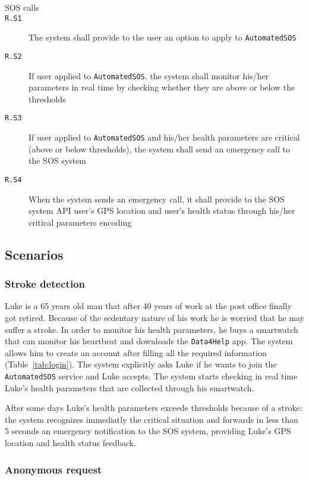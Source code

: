 \begin{description}
      \item[SOS calls]
      \item[\texttt{R.S1}] The system shall provide to the user an option to apply to \texttt{AutomatedSOS}
      \item[\texttt{R.S2}] If user applied to \texttt{AutomatedSOS}, the system shall monitor his/her parameters in real time by checking whether they are above or below the thresholds
      \item[\texttt{R.S3}] If user applied to \texttt{AutomatedSOS} and his/her health parameters are critical (above or below thresholds), the system shall send an emergency call to the SOS system
      \item[\texttt{R.S4}] When the system sends an emergency call, it shall provide to the SOS system API user's GPS location and user's health status through his/her critical parameters encoding

    \end{description}

  \subsection{Scenarios}

    \subsubsection{Stroke detection}

      Luke is a 65 years old man that after 40 years of work at the post office finally got retired. Because of the sedentary nature of his work he is worried that he may suffer a stroke. In order to monitor his health parameters, he buys a smartwatch that can monitor his heartbeat and downloads the \texttt{Data4Help} app. The system allows him to create an account after filling all the required information (Table~\ref{tab:login}). The system explicitly asks Luke if he wants to join the \texttt{AutomatedSOS} service and Luke accepts. The system starts checking in real time Luke's health parameters that are collected through his smartwatch.

      After some days Luke's health parameters exceede thresholds because of a stroke: the system recognizes immediatly the critical situation and forwards in less than 5 seconds an emergency notification to the SOS system, providing Luke's GPS location and health status feedback.

    \subsubsection{Anonymous request}

